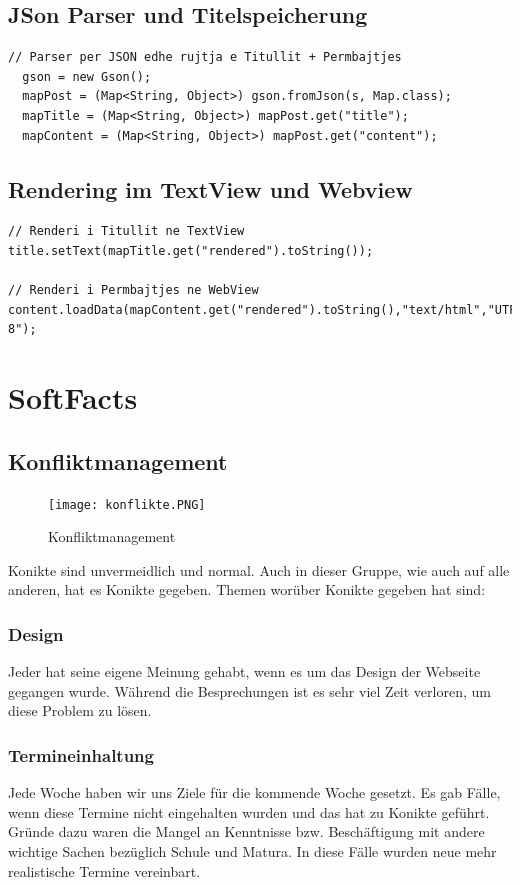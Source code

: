 \section{JSon Parser und Titelspeicherung}
\begin{verbatim}
// Parser per JSON edhe rujtja e Titullit + Permbajtjes
  gson = new Gson();
  mapPost = (Map<String, Object>) gson.fromJson(s, Map.class);
  mapTitle = (Map<String, Object>) mapPost.get("title");
  mapContent = (Map<String, Object>) mapPost.get("content");
\end{verbatim}

\section{Rendering im TextView und Webview}
\begin{verbatim}
// Renderi i Titullit ne TextView
title.setText(mapTitle.get("rendered").toString());

// Renderi i Permbajtjes ne WebView
content.loadData(mapContent.get("rendered").toString(),"text/html","UTF-8");
\end{verbatim}


\chapter{SoftFacts}


\section{Konfliktmanagement}
\begin{figure}[!h]
  \texttt{[image: konflikte.PNG]}
  \caption{Konfliktmanagement}
  \label{fig:Konfliktmanagement}
\end{figure}
Konikte sind unvermeidlich und normal. Auch in dieser Gruppe, wie auch auf alle anderen, hat es Konikte gegeben. Themen worüber Konikte gegeben hat sind:
\subsection{Design}
Jeder hat seine eigene Meinung gehabt, wenn es um das Design der Webseite gegangen wurde. Während die Besprechungen ist es sehr viel Zeit verloren, um diese Problem zu lösen.
\subsection{Termineinhaltung}
Jede Woche haben wir uns Ziele für die kommende Woche gesetzt. Es gab Fälle, wenn diese Termine nicht eingehalten wurden und das hat zu Konikte geführt. Gründe dazu waren die Mangel an Kenntnisse bzw. Beschäftigung mit andere wichtige Sachen bezüglich Schule und Matura. In diese Fälle wurden neue mehr realistische Termine vereinbart.
